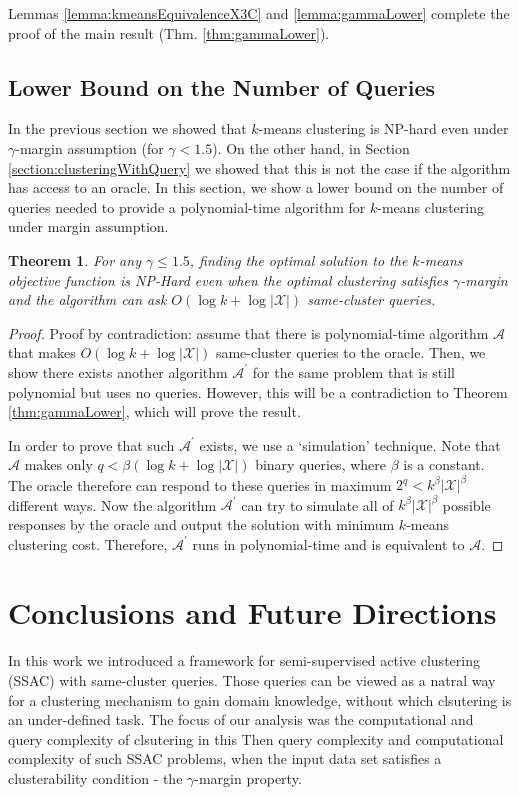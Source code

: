 \documentclass{article}
\newcommand{\mc}{\mathcal}
\newtheorem{theorem}{Theorem}
\begin{document}
Lemmas \ref{lemma:kmeansEquivalenceX3C} and \ref{lemma:gammaLower} complete the proof of the main result (Thm. \ref{thm:gammaLower}). 

\subsection{Lower Bound on the Number of Queries}

In the previous section we showed that $k$-means clustering is NP-hard even under $\gamma$-margin assumption (for $\gamma < 1.5$). On the other hand, in Section \ref{section:clusteringWithQuery} we showed that this is not the case if the algorithm has access to an oracle. In this section, we show a lower bound on the number of queries needed to provide a polynomial-time algorithm for $k$-means clustering under margin assumption.

\begin{theorem}
\label{thm:queryLower}
For any $\gamma \le 1.5$, finding the optimal solution to the $k$-means objective function is NP-Hard even when the optimal clustering satisfies $\gamma$-margin and the algorithm can ask $O(\log k + \log |\mc X|)$ same-cluster queries.
\end{theorem}
\begin{proof}
Proof by contradiction: assume that there is polynomial-time algorithm $\mc A$ that makes $O(\log k + \log |\mc X|)$ same-cluster queries to the oracle. Then, we show there exists another algorithm $\mc A^\prime$ for the same problem that is still polynomial but uses no queries. However, this will be a contradiction to Theorem \ref{thm:gammaLower}, which will prove the result.

In order to prove that such $\mc A^\prime$ exists, we use a `simulation' technique. Note that $\mc A$ makes only $q<\beta(\log k + \log |\mc X|)$ binary queries, where $\beta$ is a constant. The oracle therefore can respond to these queries in maximum $2^{q} < k^\beta|\mc X|^\beta$ different ways. Now the algorithm $\mc A^\prime$ can try to simulate all of $k^\beta|\mc X|^\beta$ possible responses by the oracle and output the solution with minimum $k$-means clustering cost. Therefore, $\mc A^\prime$ runs in polynomial-time and is equivalent to $\mc A$.
\end{proof}


\section{Conclusions and Future Directions}
In this work we introduced a framework for semi-supervised active clustering (SSAC) with same-cluster queries. Those queries can be viewed as a natral way for a clustering mechanism to gain domain knowledge, without which clsutering is an under-defined task. The focus of our analysis was the computational and query complexity of clsutering in this  Then query complexity and computational complexity of such SSAC problems, when the input data set satisfies a clusterability condition - the $\gamma$-margin property.
\end{document}
